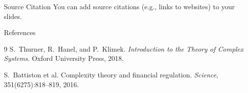 \documentclass[aspectratio=169]{beamer}
\begin{document}
\begin{frame}{Source Citation}
    You can add source citations (e.g., links to websites) to your slides.

\end{frame}

\begin{frame}{References}
    \begin{thebibliography}{9}
        S.~Thurner, R.~Hanel, and P.~Klimek.
        \textit{Introduction to the Theory of Complex Systems}.
        Oxford University Press, 2018.

        S.~Battiston et al.
        Complexity theory and financial regulation.
        \textit{Science}, 351(6275):818--819, 2016.
    \end{thebibliography}
\end{frame}

\end{document}
